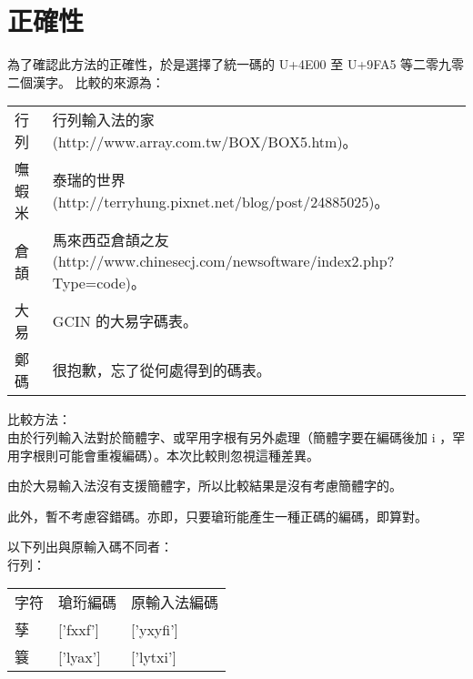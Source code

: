﻿\chapter{正確性}
為了確認此方法的正確性，於是選擇了統一碼的 U+4E00 至 U+9FA5 等二零九零二個漢字。
比較的來源為：

\begin{tabular}[t]{ll}
行列 & 行列輸入法的家(http://www.array.com.tw/BOX/BOX5.htm)。\\
嘸蝦米 & 泰瑞的世界(http://terryhung.pixnet.net/blog/post/24885025)。\\
倉頡 & 馬來西亞倉頡之友(http://www.chinesecj.com/newsoftware/index2.php?Type=code)。\\
大易 & GCIN 的大易字碼表。\\
鄭碼 & 很抱歉，忘了從何處得到的碼表。\\
\end{tabular}

比較方法：\\
由於行列輸入法對於簡體字、或罕用字根有另外處理（簡體字要在編碼後加 i ，罕用字根則可能會重複編碼）。本次比較則忽視這種差異。

由於大易輸入法沒有支援簡體字，所以比較結果是沒有考慮簡體字的。

此外，暫不考慮容錯碼。亦即，只要瑲珩能產生一種正碼的編碼，即算對。

以下列出與原輸入碼不同者：\\
行列：\\
\begin{tabular}[t]{lll}
字符 & 瑲珩編碼 & 原輸入法編碼\\
孶 & ['fxxf'] & ['yxyfi']\\
簔 & ['lyax'] & ['lytxi']\\
\end{tabular}

